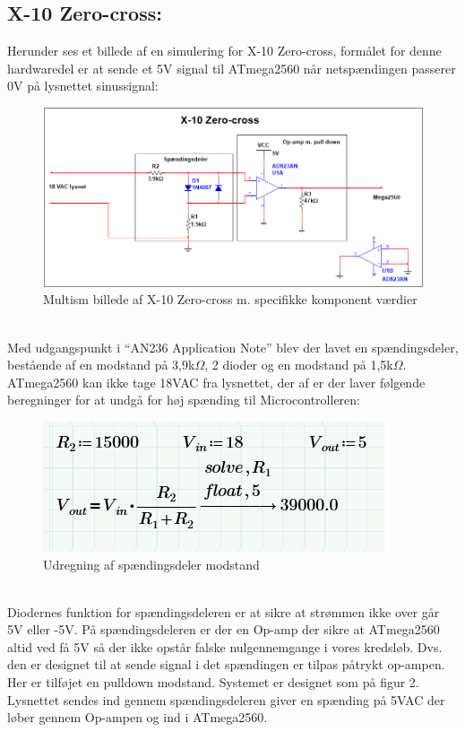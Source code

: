 \documentclass[11pt]{article}
\begin{document}
\subsection{X-10 Zero-cross: }
Herunder ses et billede af en simulering for X-10 Zero-cross, formålet for denne hardwaredel er at sende et 5V signal til ATmega2560 når netspændingen passerer 0V på lysnettet sinussignal:
\begin{figure}[!h]
\includegraphics[scale = 0.7]{Zero-cross-ms}
\caption{Multism billede af X-10 Zero-cross m. specifikke komponent værdier}
\end{figure}\\
Med udgangspunkt i ``AN236 Application Note'' blev der lavet en spændingsdeler, bestående af en modstand på 3,9k$\Omega$, 2 dioder og en modstand på 1,5k$\Omega$. ATmega2560 kan ikke tage 18VAC fra lysnettet, der af er der laver følgende beregninger for at undgå for høj spænding til Microcontrolleren: 
\begin{figure}[!h]
\centering
\includegraphics[scale = 1]{udregning-af-spandingsdeler}
\caption{Udregning af spændingsdeler modstand}
\end{figure}\\
Diodernes funktion for spændingsdeleren er at sikre at strømmen ikke over går 5V eller -5V. På spændingsdeleren er der en Op-amp der sikre at ATmega2560 altid ved få 5V så der ikke opstår falske nulgennemgange i vores kredsløb. Dvs. den er designet til at sende signal i det spændingen er tilpas påtrykt op-ampen. Her er tilføjet en pulldown modstand. Systemet er designet som på figur 2. Lysnettet sendes ind gennem spændingsdeleren giver en spænding på 5VAC der løber gennem Op-ampen og ind i ATmega2560.
\end{document}
